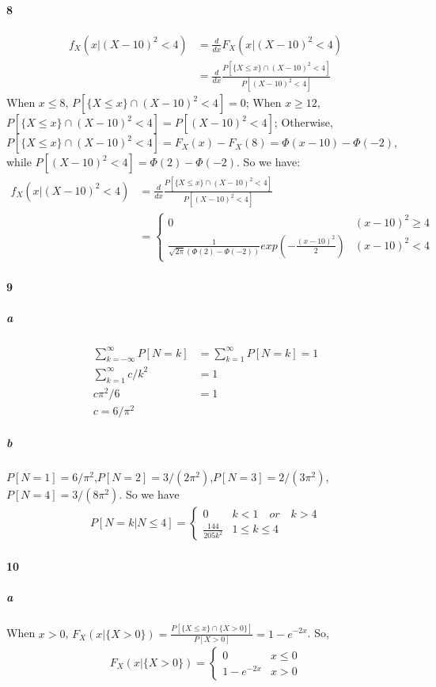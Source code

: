 \documentclass[22pt]{article}
\begin{document}
		\paragraph{8} \begin{align}
			f_X(x|(X-10)^2<4) & = \frac{d}{dx}F_X(x|(X-10)^2<4) \\
			& = \frac{d}{dx}\frac{P[\{X\leq x\}\cap (X-10)^2<4]}{P[(X-10)^2<4]}
		\end{align}
		When $x\leq 8$, $P[\{X\leq x\}\cap (X-10)^2<4] = 0$; When $x\geq 12$, $P[\{X\leq x\}\cap (X-10)^2<4] = P[(X-10)^2<4]$; Otherwise, $P[\{X\leq x\}\cap (X-10)^2<4] = F_X(x)-F_X(8)= \Phi(x-10)-\Phi(-2)$, while $P[(X-10)^2<4]=\Phi(2)-\Phi(-2)$.
		So we have:
		\begin{align}
				f_X(x|(X-10)^2<4) & = \frac{d}{dx}\frac{P[\{X\leq x\}\cap (X-10)^2<4]}{P[(X-10)^2<4]} \\
				& = \begin{cases}
				0 & (x-10)^2 \geq 4\\
				\frac{1}{\sqrt{2 \pi}(\Phi(2)-\Phi(-2))}exp(-\frac{(x-10)^2}{2})  & (x-10)^2 <4
				\end{cases}
			\end{align}

		\paragraph{9}
		\subparagraph{a}
		\begin{align}
		\sum_{k=-\infty}^{\infty}P[N=k] & = \sum_{k=1}^{\infty}P[N=k] = 1\\
		\sum_{k=1}^{\infty} c/k^2 & = 1\\
		c \pi	^2/6 & = 1\\
		c = 6/\pi^2
		\end{align}

		\subparagraph{b} $P[N = 1] = 6/\pi^2$,$P[N = 2] = 3/(2\pi^2)$,$P[N = 3] = 2/(3\pi^2)$,$P[N = 4] = 3/(8\pi^2)$.
		So we have
		\begin{align}
				P[N = k|N \leq 4] = 
				\begin{cases}
				0 & k< 1 \quad or \quad k>4\\
				\frac{144}{205k^2} & 1\leq k \leq 4 
				\end{cases}
			\end{align}

		\paragraph{10}
			\subparagraph{a} 
				When $x>0$, $F_X(x|\{X>0\}) = \frac{P[\{X\leq x\}\cap \{X>0\}]}{P[X>0]} = 1 - e^{-2x}$. 
				So,
				\begin{align}
				F_X(x|\{X>0\}) = 
				\begin{cases}
				0 & x\leq 0\\
				1 - e^{-2x} & x>0
				\end{cases}
			\end{align}
\end{document}
